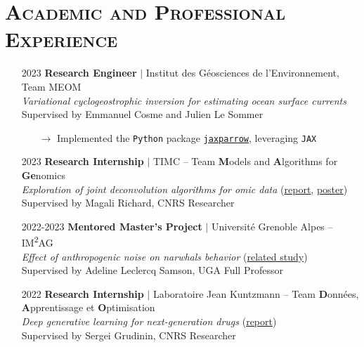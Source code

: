 \documentclass{article}
\begin{document}
\section*{\textsc{Academic and Professional Experience}}
\begin{itemize}
    \item[] 2023 \tabto{2cm} \textbf{Research Engineer} $\vert$ Institut des Géosciences de l'Environnement, Team MEOM \\[.1 cm]
    \tabto{2cm} \textit{Variational cyclogeostrophic inversion for estimating ocean surface currents} \\[.1 cm]
    \tabto{2cm} Supervised by Emmanuel Cosme and Julien Le Sommer
    \vspace{-.1 cm}
    \begin{itemize}[left=2cm]
        \item[$\rightarrow$] Implemented the \texttt{Python} package \href{https://github.com/meom-group/jaxparrow}{\texttt{jaxparrow}}, leveraging \texttt{JAX}
    \end{itemize}
    
    \item[] 2023 \tabto{2cm} \textbf{Research Internship} $\vert$ TIMC – Team \textbf{M}odels and \textbf{A}lgorithms for \textbf{Ge}nomics \\[.1 cm]
    \tabto{2cm} \textit{Exploration of joint deconvolution algorithms for omic data} (\href{https://vadmbertr.github.io/Exploration-of-joint-deconvolution-algorithms-for-omic-data/M2_Internship_report__Exploration_of_joint_deconvolution_algorithms_for_omic_data.pdf}{report}, \href{https://vadmbertr.github.io/Exploration-of-joint-deconvolution-algorithms-for-omic-data/poster_jobim_ismb.pdf}{poster}) \\[.1 cm]
    \tabto{2cm} Supervised by Magali Richard, CNRS Researcher
    
    \item[] 2022-2023 \tabto{2cm} \textbf{Mentored Master's Project} $\vert$ Université Grenoble Alpes – IM\textsuperscript{2}AG \\[.1 cm]
    \tabto{2cm} \textit{Effect of anthropogenic noise on narwhals behavior} (\href{https://doi.org/10.1126/sciadv.ade0440}{related study}) \\[.1 cm]
    \tabto{2cm} Supervised by Adeline Leclercq Samson, UGA Full Professor
    
    \item[] 2022 \tabto{2cm} \textbf{Research Internship} $\vert$ Laboratoire Jean Kuntzmann – Team \textbf{D}onnées, \textbf{A}pprentissage et \textbf{O}ptimisation \\[.1 cm]
    \tabto{2cm} \textit{Deep generative learning for next-generation drugs} (\href{https://vadmbertr.github.io/Deep-generative-learning-for-next-generation-drugs/Internship_report___Deep_generative_learning_for_next_generation_drugs.pdf}{report}) \\[.1 cm]
    \tabto{2cm} Supervised by Sergei Grudinin, CNRS Researcher
    

\end{itemize}
\end{document}
